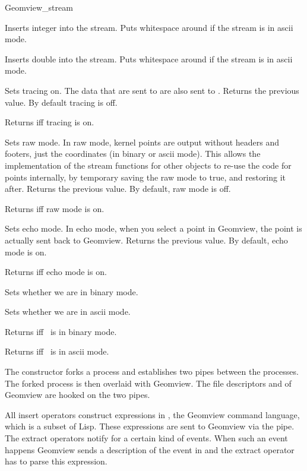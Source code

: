 \begin{ccRefClass}{Geomview_stream}
\begin{ccAdvanced}
{Inserts integer  into the stream. Puts whitespace around if the
stream is in ascii mode.}

{Inserts double  into the stream. Puts whitespace around if the
stream is in ascii mode.}

{Sets tracing on. The data that are sent to  are also
 sent to .  Returns the previous value. By default tracing is
 off.}

{Returns  iff tracing is on.}

{Sets raw mode.  In raw mode, kernel points are output without headers and
 footers, just the coordinates (in binary or ascii mode).  This allows the
 implementation of the stream functions for other objects to re-use the
 code for points internally, by temporary saving the raw mode to true, and
 restoring it after.
   Returns the previous value. By default, raw mode is off.}

{Returns  iff raw mode is on.}

{Sets echo mode.  In echo mode, when you select a point in Geomview, the point
 is actually sent back to Geomview.
 Returns the previous value. By default, echo mode is on.}

{Returns  iff echo mode is on.}

{Sets whether we are in binary mode.}

{Sets whether we are in ascii mode.}

{Returns  iff \ccVar\ is in binary mode.}

{Returns  iff \ccVar\ is in ascii mode.}

\end{ccAdvanced}

\ccImplementation

The constructor forks a process and establishes two pipes between the
processes. The forked process is then overlaid with Geomview. The
file descriptors  and  of Geomview are hooked
on the two pipes.

All insert operators construct expressions in , the Geomview
command language, which is a subset of {\sc Lisp}. These expressions
are sent to Geomview via the pipe. The extract operators notify 
for a certain kind of events. When such an event happens Geomview
sends a description of the event in  and the extract operator has
to parse this expression.


\end{ccRefClass}
